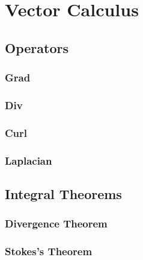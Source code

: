 \section{Vector Calculus}
\subsection{Operators}
\subsubsection{Grad}
\subsubsection{Div}
\subsubsection{Curl}
\subsubsection{Laplacian}
\subsection{Integral Theorems}
\subsubsection{Divergence Theorem}
\subsubsection{Stokes's Theorem}